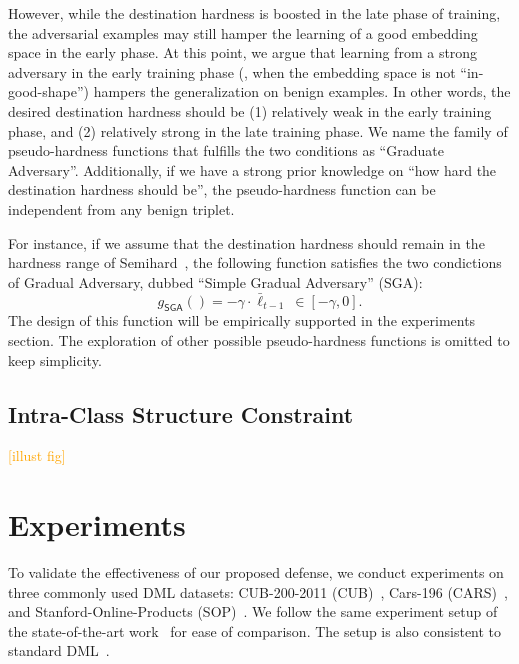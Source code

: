\documentclass[10pt,twocolumn,letterpaper]{article}
\newcommand{\oo}[1]{\textcolor{orange}{#1}}
\begin{document}

However, while the destination hardness is boosted in the late phase of
training, the adversarial examples may still hamper the learning of a good
embedding space in the early phase.
%
At this point, we argue that learning from a strong adversary in the early
training phase (\ie, when the embedding space is not ``in-good-shape'') hampers the
generalization on benign examples.
%
In other words, the desired destination hardness should be (1) relatively weak
in the early training phase, and (2) relatively strong in the late training
phase.
%
We name the family of pseudo-hardness functions that fulfills the two
conditions as ``Graduate Adversary''.
%
Additionally, if we have a strong prior knowledge on ``how hard the destination
hardness should be'', the pseudo-hardness function can be independent from
any benign triplet.


For instance, if we assume that the destination hardness should remain
in the hardness range of Semihard~\cite{facenet}, the following function
satisfies the two condictions of Gradual Adversary, dubbed
``Simple Gradual Adversary'' (SGA):
%
\begin{equation}
	g_\mathsf{SGA}() = -\gamma \cdot \bar{\ell}_{t-1} ~ \in [-\gamma,0].
\end{equation}
%
The design of this function will be empirically supported in the experiments
section.
%
The exploration of other possible pseudo-hardness functions is omitted to 
keep simplicity.

\subsection{Intra-Class Structure Constraint}
\label{sec:33}

\oo{[illust fig]}

\section{Experiments}
\label{sec:4}

To validate the effectiveness of our proposed defense, we conduct experiments
on three commonly used DML datasets: CUB-200-2011 (CUB)~\cite{cub200}, Cars-196
(CARS)~\cite{cars196}, and Stanford-Online-Products (SOP)~\cite{sop}.
%
We follow the same experiment setup of the state-of-the-art work~\cite{robrank}
for ease of comparison.
%
The setup is also consistent to standard DML~\cite{revisiting}.
\end{document}
